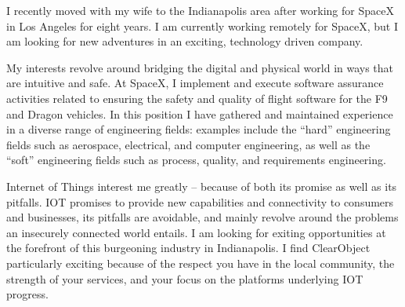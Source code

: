 \documentclass[11pt, a4paper]{awesome-cv} %
\begin{document}
\makecvheader %

\makelettertitle %


\begin{cvletter}



I recently moved with my wife to the Indianapolis area after working
for SpaceX in Los Angeles for eight years. I am currently working
remotely for SpaceX, but I am looking for new adventures in an
exciting, technology driven company.

My interests revolve around bridging the digital and physical world in
ways that are intuitive and safe. At SpaceX, I implement and execute
software assurance activities related to ensuring the safety and
quality of flight software for the F9 and Dragon vehicles. In this
position I have gathered and maintained experience in a diverse range
of engineering fields: examples include the ``hard'' engineering
fields such as aerospace, electrical, and computer engineering, as
well as the ``soft'' engineering fields such as process, quality, and
requirements engineering.




Internet of Things interest me greatly -- because of both its promise
as well as its pitfalls. IOT promises to provide new capabilities and
connectivity to consumers and businesses, its pitfalls are avoidable,
and mainly revolve around the problems an insecurely connected world
entails. I am looking for exiting opportunities at the forefront of
this burgeoning industry in Indianapolis. I find ClearObject
particularly exciting because of the respect you have in the local
community, the strength of your services, and your focus on the
platforms underlying IOT progress.




\end{cvletter}
\end{document}
